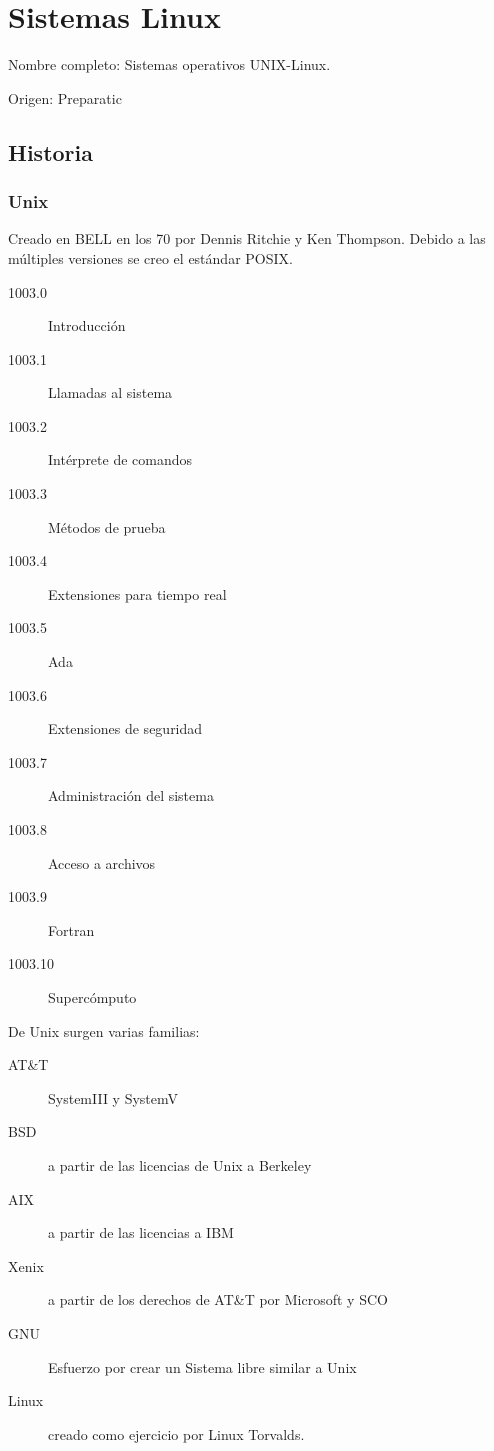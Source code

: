 \setcounter{section}{59} %
\section{Sistemas Linux}

Nombre completo: Sistemas operativos UNIX-Linux.

Origen: Preparatic

\localtableofcontents

\subsection{Historia}
    \subsubsection{Unix}
        Creado en BELL en los 70 por Dennis Ritchie y Ken Thompson. Debido a las múltiples versiones se creo el estándar POSIX.
        \begin{description}
            \item[1003.0] Introducción
            \item[1003.1] Llamadas al sistema
            \item[1003.2] Intérprete de comandos
            \item[1003.3] Métodos de prueba
            \item[1003.4] Extensiones para tiempo real
            \item[1003.5] Ada
            \item[1003.6] Extensiones de seguridad
            \item[1003.7] Administración del sistema
            \item[1003.8] Acceso a archivos
            \item[1003.9] Fortran
            \item[1003.10] Supercómputo
        \end{description}

        De Unix surgen varias familias:
        \begin{description}
            \item[AT\&T] SystemIII y SystemV
            \item[BSD] a partir de las licencias de Unix a Berkeley
            \item[AIX] a partir de las licencias a IBM
            \item[Xenix] a partir de los derechos de AT\&T por Microsoft y SCO
            \item[GNU] Esfuerzo por crear un Sistema libre similar a Unix
            \item[Linux] creado como ejercicio por Linux Torvalds.
        \end{description}

